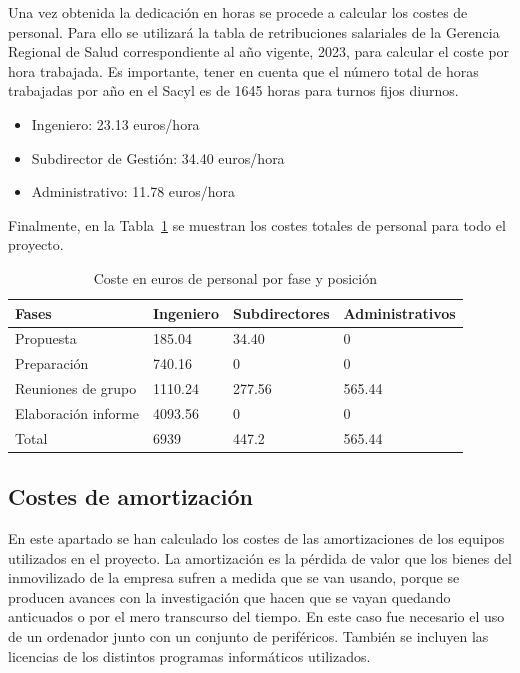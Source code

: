 Una vez obtenida la dedicación en horas se procede a calcular los costes de personal. Para ello se utilizará la tabla de retribuciones salariales de la Gerencia Regional de Salud correspondiente al año vigente, 2023, para calcular el coste por hora trabajada. Es importante, tener en cuenta que el número total de horas trabajadas por año en el Sacyl es de 1645 horas para turnos fijos diurnos.

\begin{itemize}
    \item Ingeniero: 23.13 euros/hora
    \item Subdirector de Gestión: 34.40 euros/hora
    \item Administrativo: 11.78 euros/hora
\end{itemize}

Finalmente, en la Tabla~\ref{tab:coste-horas} se muestran los costes totales de personal para todo el proyecto.

\begin{table}[H]
    \centering
    \begin{tabular}{llll}
        \toprule
        Fases               & Ingeniero & Subdirectores & Administrativos \\
        \midrule
        Propuesta           & 185.04    & 34.40         & 0               \\
        Preparación         & 740.16    & 0             & 0               \\
        Reuniones de grupo  & 1110.24   & 277.56        & 565.44          \\
        Elaboración informe & 4093.56   & 0             & 0               \\
        \midrule
        Total               & 6939      & 447.2         & 565.44          \\
        \bottomrule
    \end{tabular}
    \caption{Coste en euros de personal por fase y posición}
    \label{tab:coste-horas}
\end{table}

\subsection{Costes de amortización}

En este apartado se han calculado los costes de las amortizaciones de los equipos utilizados en el proyecto.
La amortización es la pérdida de valor que los bienes del inmovilizado de la empresa sufren a medida que se van usando, porque se producen avances con la investigación que hacen que se vayan quedando anticuados o por el mero transcurso del tiempo.
En este caso fue necesario el uso de un ordenador junto con un conjunto de periféricos.
También se incluyen las licencias de los distintos programas informáticos utilizados.

